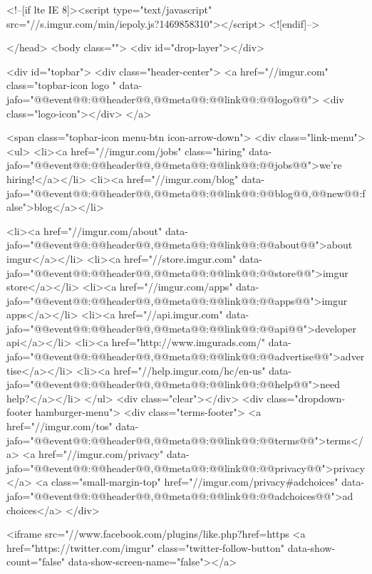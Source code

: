     <!--[if lte IE 8]><script type="text/javascript" src="//s.imgur.com/min/iepoly.js?1469858310"></script>
<![endif]-->
    
</head>
<body class="">
    <div id="drop-layer"></div>
                        

<div id="topbar">
    <div class="header-center">
        <a href="//imgur.com" class="topbar-icon logo " data-jafo="{@@event@@:@@header@@,@@meta@@:{@@link@@:@@logo@@}}">
            <div class="logo-icon"></div>
        </a>

        <span class="topbar-icon menu-btn icon-arrow-down">
            <div class="link-menu">
                <ul>
                    <li><a href="//imgur.com/jobs" class="hiring" data-jafo="{@@event@@:@@header@@,@@meta@@:{@@link@@:@@jobs@@}}">we're hiring!</a></li>
                                        <li><a href="//imgur.com/blog" data-jafo="{@@event@@:@@header@@,@@meta@@:{@@link@@:@@blog@@,@@new@@:false}}">blog</a></li>
                    
                    <li><a href="//imgur.com/about"  data-jafo="{@@event@@:@@header@@,@@meta@@:{@@link@@:@@about@@}}">about imgur</a></li>
                    <li><a href="//store.imgur.com" data-jafo="{@@event@@:@@header@@,@@meta@@:{@@link@@:@@store@@}}">imgur store</a></li>
                    <li><a href="//imgur.com/apps"  data-jafo="{@@event@@:@@header@@,@@meta@@:{@@link@@:@@apps@@}}">imgur apps</a></li>
                    <li><a href="//api.imgur.com" data-jafo="{@@event@@:@@header@@,@@meta@@:{@@link@@:@@api@@}}">developer api</a></li>
                    <li><a href="http://www.imgurads.com/" data-jafo="{@@event@@:@@header@@,@@meta@@:{@@link@@:@@advertise@@}}">advertise</a></li>
                    <li><a href="//help.imgur.com/hc/en-us" data-jafo="{@@event@@:@@header@@,@@meta@@:{@@link@@:@@help@@}}">need help?</a></li>
                </ul>
                <div class="clear"></div>
                <div class="dropdown-footer hamburger-menu">
                    <div class="terms-footer">
                        <a href="//imgur.com/tos"  data-jafo="{@@event@@:@@header@@,@@meta@@:{@@link@@:@@terms@@}}">terms</a>
                        <a href="//imgur.com/privacy"  data-jafo="{@@event@@:@@header@@,@@meta@@:{@@link@@:@@privacy@@}}">privacy</a>
                        <a class="small-margin-top" href="//imgur.com/privacy#adchoices" data-jafo="{@@event@@:@@header@@,@@meta@@:{@@link@@:@@adchoices@@}}">ad choices</a>
                    </div>
                     
                    <iframe src="//www.facebook.com/plugins/like.php?href=https%
                    <a href="https://twitter.com/imgur" class="twitter-follow-button" data-show-count="false" data-show-screen-name="false"></a>
                    

